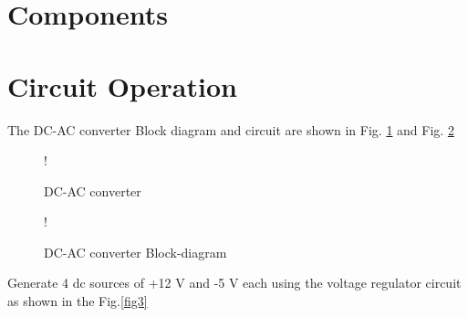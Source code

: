 \documentclass[journal,12pt,twocolumn]{IEEEtran}
\begin{document}
\section{Components}
\begin{table}[!ht]
\centering

\caption{}
\label{table:components}
\end{table}
\section{Circuit Operation}
The DC-AC converter Block diagram and circuit are shown in Fig. \ref{fig1} and Fig. \ref{fig2}
\begin{figure}[!ht]
\centering
\resizebox {\columnwidth} {!} {

}
\caption{DC-AC converter} 
\label{fig1}
\end{figure}
\begin{figure}[!ht]
\centering
\resizebox {\columnwidth} {!} {

}
\caption{DC-AC converter Block-diagram} 
\label{fig2}
\end{figure}

\begin{problem}
Generate 4 dc sources of +12 V and -5 V each using the voltage regulator circuit as shown in the Fig.\ref{fig3}  
  \end{problem}
\end{document}

